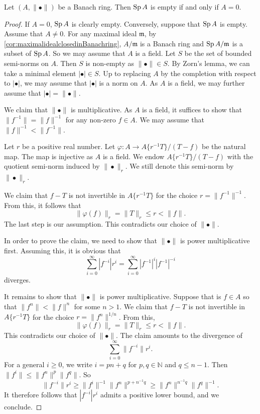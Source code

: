 \begin{proposition}\label{prop-Berkospecnonempty}
    Let $(A,\|\bullet\|)$ be a Banach ring. Then $\operatorname{Sp} A$ is empty if and only if $A=0$.
\end{proposition}

\begin{proof}
    If $A=0$, $\operatorname{Sp} A$ is clearly empty. Conversely, suppose that $\operatorname{Sp} A$ is empty. Assume that $A\neq 0$. For any maximal ideal $\mathfrak{m}$, by \cref{cor:maximalidealclosedinBanachring}, $A/\mathfrak{m}$ is a Banach ring and $\operatorname{Sp} A/\mathfrak{m}$ is a subset of $\operatorname{Sp} A$. So we may assume that $A$ is a field. Let $S$ be the set of bounded semi-norms on $A$. Then $S$ is non-empty as $\|\bullet\|\in S$. By Zorn's lemma, we can take a minimal element $|\bullet|\in S$. Up to replacing $A$ by the completion with respect to $|\bullet|$, we may assume that $|\bullet |$ is a norm on $A$. As $A$ is a field, we may further assume that $|\bullet|=\|\bullet\|$.
    
    We claim that $\|\bullet\|$ is multiplicative. As $A$ is a field, it suffices to show that $\|f^{-1}\|=\|f\|^{-1}$ for any non-zero $f\in A$. We may assume that $\|f\|^{-1}<\|f^{-1}\|$.
    
    Let $r$ be a positive real number. Let $\varphi:A\rightarrow A\{r^{-1}T\}/(T-f)$ be the natural map. The map is injective as $A$ is a field. We endow $A\{r^{-1}T\}/(T-f)$ with the quotient semi-norm induced by $\|\bullet\|_r$. We still denote this semi-norm by $\|\bullet\|_r$.

    We claim that $f-T$ is not invertible in $A\{r^{-1}T\}$ for the choice $r=\|f^{-1}\|^{-1}$. From this, it follows that 
    \[
        \|\varphi(f)\|_r  =\|T\|_r\leq r <\|f\|.
    \]
    The last step is our assumption. This contradicts our choice of $\|\bullet\|$.
    
    In order to prove the claim, we need to show that $\|\bullet\|$ is power multiplicative first. Assuming this, it is obvious that 
    \[
        \sum_{i=0}^{\infty}|f^{-i}|r^i=\sum_{i=0}^{\infty}|f^{-1}|^{i}|f^{-1}|^{-i}
    \]
    diverges.
    
    It remains to show that $\|\bullet\|$ is power multiplicative.
    Suppose that is $f\in A$ so that $\|f^n\|<\|f\|^n$ for some $n>1$. We claim that $f-T$ is not invertible in $A\{r^{-1}T\}$  for the choice $r=\|f^{n}\|^{1/n}$. From this,
    \[
      \|\varphi(f)\|_r=\|T\|_r\leq r<\|f\|.  
    \]
    This contradicts our choice of $\|\bullet\|$. The claim amounts to the divergence of
    \[
        \sum_{i=0}^{\infty}\|f^{-i}\|r^i.
    \]
    For a general $i\geq 0$, we write $i=pn+q$ for $p,q\in \mathbb{N}$ and $q\leq n-1$. Then $\|f^i\|\leq \|f^n\|^p \|f^q\|$. So 
    \[
        \|f^{-i}\|r^i\geq \|f^i\|^{-1} \|f^n\|^{p+n^{-1}q}\geq \|f^n\|^{n^{-1}q}\|f^q\|^{-1}.  
    \]
    It therefore follows that $|f^{-i}|r^i$ admits a positive lower bound, and we conclude.
\end{proof}


